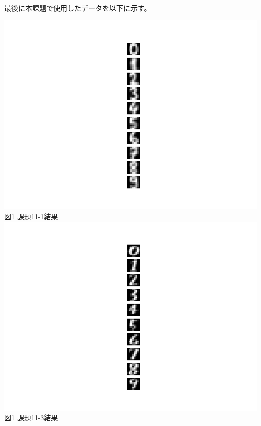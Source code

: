 \documentclass[a4paper]{ltjsarticle}
\begin{document}
\newpage
最後に本課題で使用したデータを以下に示す。
\begin{center}
    \includegraphics{output11-1.png} \\
    図1 課題11-1結果\\
    \includegraphics{output11-3.png} \\
    図1 課題11-3結果
\end{center}
\end{document}
